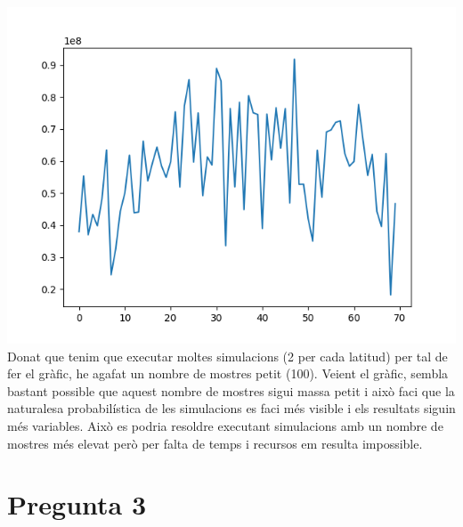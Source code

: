 \documentclass{article}
\begin{document}
\includegraphics[scale=0.8]{Figure_1.png}
Donat que tenim que executar moltes simulacions (2 per cada latitud) per tal de fer el gràfic, he agafat un nombre de mostres petit (100). Veient el gràfic, sembla bastant possible que aquest nombre de mostres sigui massa petit i això faci que la naturalesa probabilística de les simulacions es faci més visible i els resultats siguin més variables. Això es podria resoldre executant simulacions amb un nombre de mostres més elevat però per falta de temps i recursos em resulta impossible.

\section*{Pregunta 3}
\end{document}
